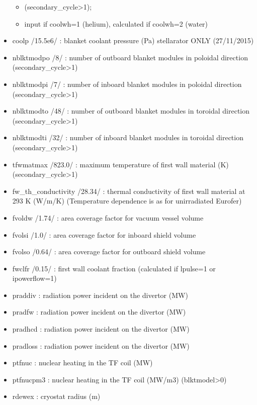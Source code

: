 \documentclass[]{article}
\providecommand{\tightlist}{%
  \setlength{\itemsep}{0pt}\setlength{\parskip}{0pt}}
\begin{document}
\begin{itemize}
  \begin{itemize}
  \tightlist
  \item
    (secondary\_cycle\textgreater{}1);
  \item
    input if coolwh=1 (helium), calculated if coolwh=2 (water)
  \end{itemize}
\item
  coolp /15.5e6/ : blanket coolant pressure (Pa) stellarator ONLY
  (27/11/2015)
\item
  nblktmodpo /8/ : number of outboard blanket modules in poloidal
  direction (secondary\_cycle\textgreater{}1)
\item
  nblktmodpi /7/ : number of inboard blanket modules in poloidal
  direction (secondary\_cycle\textgreater{}1)
\item
  nblktmodto /48/ : number of outboard blanket modules in toroidal
  direction (secondary\_cycle\textgreater{}1)
\item
  nblktmodti /32/ : number of inboard blanket modules in toroidal
  direction (secondary\_cycle\textgreater{}1)
\item
  tfwmatmax /823.0/ : maximum temperature of first wall material (K)
  (secondary\_cycle\textgreater{}1)
\item
  fw\_th\_conductivity /28.34/ : thermal conductivity of first wall
  material at 293 K (W/m/K) (Temperature dependence is as for
  unirradiated Eurofer)
\item
  fvoldw /1.74/ : area coverage factor for vacuum vessel volume
\item
  fvolsi /1.0/ : area coverage factor for inboard shield volume
\item
  fvolso /0.64/ : area coverage factor for outboard shield volume
\item
  fwclfr /0.15/ : first wall coolant fraction (calculated if lpulse=1 or
  ipowerflow=1)
\item
  praddiv : radiation power incident on the divertor (MW)
\item
  pradfw : radiation power incident on the divertor (MW)
\item
  pradhcd : radiation power incident on the divertor (MW)
\item
  pradloss : radiation power incident on the divertor (MW)
\item
  ptfnuc : nuclear heating in the TF coil (MW)
\item
  ptfnucpm3 : nuclear heating in the TF coil (MW/m3)
  (blktmodel\textgreater{}0)
\item
  rdewex : cryostat radius (m)

\end{itemize}
\end{document}
